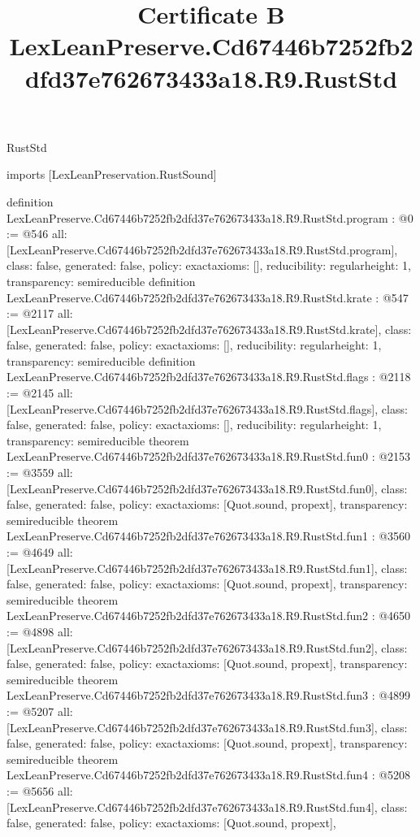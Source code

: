 \begin{lexlean}{RustStd}
\title{Certificate B LexLeanPreserve.Cd67446b7252fb2dfd37e762673433a18.R9.RustStd}
\begin{coremodule}
imports [LexLeanPreservation.RustSound]

definition LexLeanPreserve.Cd67446b7252fb2dfd37e762673433a18.R9.RustStd.program : @0 := @546 {
  all: [LexLeanPreserve.Cd67446b7252fb2dfd37e762673433a18.R9.RustStd.program],
  class: false,
  generated: false,
  policy: exact{axioms: []},
  reducibility: regular{height: 1},
  transparency: semireducible
}
definition LexLeanPreserve.Cd67446b7252fb2dfd37e762673433a18.R9.RustStd.krate : @547 := @2117 {
  all: [LexLeanPreserve.Cd67446b7252fb2dfd37e762673433a18.R9.RustStd.krate],
  class: false,
  generated: false,
  policy: exact{axioms: []},
  reducibility: regular{height: 1},
  transparency: semireducible
}
definition LexLeanPreserve.Cd67446b7252fb2dfd37e762673433a18.R9.RustStd.flags : @2118 := @2145 {
  all: [LexLeanPreserve.Cd67446b7252fb2dfd37e762673433a18.R9.RustStd.flags],
  class: false,
  generated: false,
  policy: exact{axioms: []},
  reducibility: regular{height: 1},
  transparency: semireducible
}
theorem LexLeanPreserve.Cd67446b7252fb2dfd37e762673433a18.R9.RustStd.fun0 : @2153 := @3559 {
  all: [LexLeanPreserve.Cd67446b7252fb2dfd37e762673433a18.R9.RustStd.fun0],
  class: false,
  generated: false,
  policy: exact{axioms: [Quot.sound, propext]},
  transparency: semireducible
}
theorem LexLeanPreserve.Cd67446b7252fb2dfd37e762673433a18.R9.RustStd.fun1 : @3560 := @4649 {
  all: [LexLeanPreserve.Cd67446b7252fb2dfd37e762673433a18.R9.RustStd.fun1],
  class: false,
  generated: false,
  policy: exact{axioms: [Quot.sound, propext]},
  transparency: semireducible
}
theorem LexLeanPreserve.Cd67446b7252fb2dfd37e762673433a18.R9.RustStd.fun2 : @4650 := @4898 {
  all: [LexLeanPreserve.Cd67446b7252fb2dfd37e762673433a18.R9.RustStd.fun2],
  class: false,
  generated: false,
  policy: exact{axioms: [Quot.sound, propext]},
  transparency: semireducible
}
theorem LexLeanPreserve.Cd67446b7252fb2dfd37e762673433a18.R9.RustStd.fun3 : @4899 := @5207 {
  all: [LexLeanPreserve.Cd67446b7252fb2dfd37e762673433a18.R9.RustStd.fun3],
  class: false,
  generated: false,
  policy: exact{axioms: [Quot.sound, propext]},
  transparency: semireducible
}
theorem LexLeanPreserve.Cd67446b7252fb2dfd37e762673433a18.R9.RustStd.fun4 : @5208 := @5656 {
  all: [LexLeanPreserve.Cd67446b7252fb2dfd37e762673433a18.R9.RustStd.fun4],
  class: false,
  generated: false,
  policy: exact{axioms: [Quot.sound, propext]},
}
\end{coremodule}
\end{lexlean}
